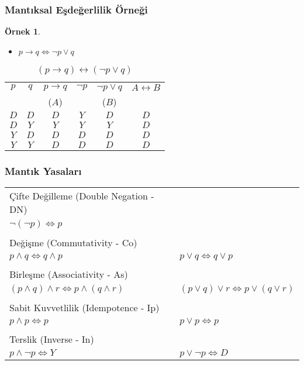 \documentclass[dvipsnames]{beamer}
\theoremstyle{definition}
\theoremstyle{example}
\newtheorem{ornek}[theorem]{Örnek}
\theoremstyle{plain}
\begin{document}
\begin{frame}
  \frametitle{Mantıksal Eşdeğerlilik Örneği}

  \begin{ornek}
    \begin{itemize}
      \item $p \rightarrow q \Leftrightarrow \neg p \vee q$
    \end{itemize}

    \begin{table}
      \caption{$(p \rightarrow q) \leftrightarrow (\neg p \vee q)$}
      \begin{tabular}{|c|c|c|c|c||c|}\hline
        $p$ & $q$ & $p \rightarrow q$ & $\neg p$ & $\neg p \vee q$ & $A \leftrightarrow B$\\
            &     & ($A$)             &          & ($B$)           &\\\hline\hline
        $D$ & $D$ & $D$ & $Y$ & $D$ & $D$\\\hline
        $D$ & $Y$ & $Y$ & $Y$ & $Y$ & $D$\\\hline
        $Y$ & $D$ & $D$ & $D$ & $D$ & $D$\\\hline
        $Y$ & $Y$ & $D$ & $D$ & $D$ & $D$\\\hline
      \end{tabular}
    \end{table}
  \end{ornek}
\end{frame}

\begin{frame}
  \frametitle{Mantık Yasaları}

  \begin{tabular}{ll}
  \alert{Çifte Değilleme (Double Negation - DN)} &\\
    $\neg (\neg p) \Leftrightarrow p$ &\\\\
  \pause
  \alert{Değişme (Commutativity - Co)} &\\
    $p \wedge q \Leftrightarrow q \wedge p$ &
    $p \vee q \Leftrightarrow q \vee p$\\\\
  \pause
  \alert{Birleşme (Associativity - As)} &\\
    $(p \wedge q) \wedge r \Leftrightarrow p \wedge (q \wedge r)$ &
    $(p \vee q) \vee r \Leftrightarrow p \vee (q \vee r)$\\\\
  \pause
  \alert{Sabit Kuvvetlilik (Idempotence - Ip)} &\\
    $p \wedge p \Leftrightarrow p$ &
    $p \vee p \Leftrightarrow p$\\\\
  \pause
  \alert{Terslik (Inverse - In)} &\\
    $p \wedge \neg p \Leftrightarrow Y$ &
    $p \vee \neg p \Leftrightarrow D$
  \end{tabular}
\end{frame}
\end{document}
